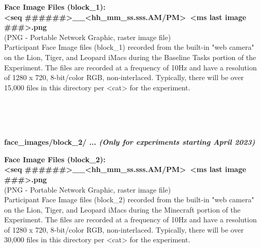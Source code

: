 \begin{description}
\begin{addmargin}[0em]{0em}
    \begin{addmargin}[1em]{0em} %
        \textbf{Face Image Files (block\_1):\\<seq \#\#\#\#\#\#>\_<yyyy-mm-dd>\_<hh\_mm\_ss.sss.AM/PM>~<ms last image \#\#\#>.png}\\
        (PNG - Portable Network Graphic, raster image file)\\
        Participant Face Image files (block\_1) recorded from the built-in "web camera" on the Lion, Tiger,
        and Leopard iMacs during the Baseline Tasks portion of the Experiment.
        The files are recorded at a frequency of 10Hz and have a resolution of 1280 x 720, 8-bit/color RGB, non-interlaced.
        Typically, there will be over 15,000 files in this directory per <cat> for the experiment. 
    \end{addmargin} %

\end{addmargin} %


\textbf{\\\\\\}
\begin{addmargin}[0em]{0em} %
    \textbf{face\_images/block\_2/ ... \textit{(Only for experiments starting April 2023)}}

    \begin{addmargin}[1em]{0em} %
        \textbf{Face Image Files (block\_2):\\<seq \#\#\#\#\#\#>\_<yyyy-mm-dd>\_<hh\_mm\_ss.sss.AM/PM>~<ms last image \#\#\#>.png}\\
        (PNG - Portable Network Graphic, raster image file)\\
        Participant Face Image files (block\_2) recorded from the built-in "web camera" on the Lion, Tiger,
        and Leopard iMacs during the Minecraft portion of the Experiment.
        The files are recorded at a frequency of 10Hz and have a resolution of 1280 x 720, 8-bit/color RGB, non-interlaced.
        Typically, there will be over 30,000 files in this directory per <cat> for the experiment. 
    \end{addmargin} %


\end{addmargin}
\end{description}
